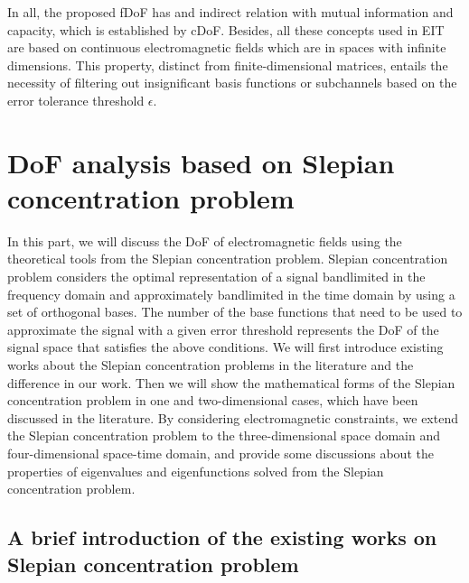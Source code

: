 \documentclass[12pt,draftclsnofoot,journal,onecolumn]{IEEEtran}
\begin{document}
{	In all, the proposed fDoF has and indirect relation with mutual information and capacity, which is established by cDoF. Besides, all these concepts used in EIT are based on continuous electromagnetic fields which are in spaces with infinite dimensions. This property, distinct from finite-dimensional matrices, entails the necessity of filtering out insignificant basis functions or subchannels based on the error tolerance threshold $\epsilon$. 
	
	}
	
	\section{DoF analysis based on Slepian concentration problem}
	\label{sec_theoretical_dof}
	In this part, we will discuss the DoF of electromagnetic fields using the theoretical tools from the Slepian concentration problem. 
	Slepian concentration problem considers the optimal representation of a signal bandlimited in the frequency domain and approximately bandlimited in the time domain by using a set of orthogonal bases. The number of the base functions that need to be used to approximate the signal with a given error threshold represents the DoF of the signal space that satisfies the above conditions. {\color{red}We will first introduce existing works about the Slepian concentration problems in the literature and the difference in our work. Then we will show the mathematical forms of the Slepian concentration problem in one and two-dimensional cases, which have been discussed in the literature. By considering electromagnetic constraints, we extend the Slepian concentration problem to the three-dimensional space domain and four-dimensional space-time domain, and provide some discussions about the properties of eigenvalues and eigenfunctions solved from the Slepian concentration problem}. 

	{\color{red}
	\subsection{A brief introduction of the existing works on Slepian concentration problem}
	}
	
\end{document}
